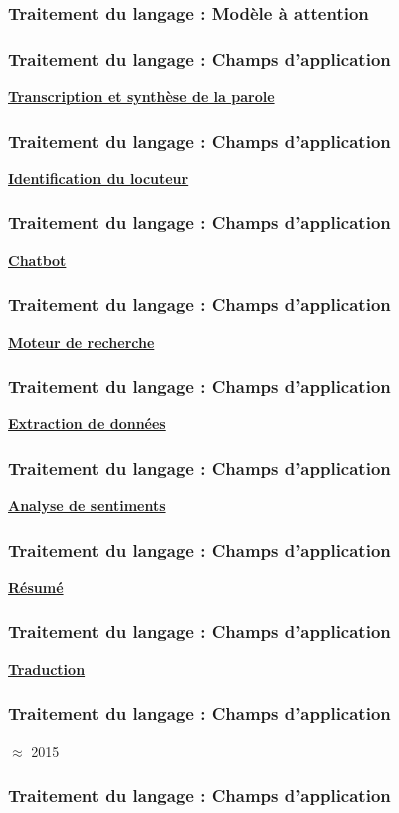 \documentclass{formation}
\begin{document}
\begin{frame}
  \frametitle{Traitement du langage : Modèle à attention} 
\end{frame}

\begin{frame}
  \frametitle{Traitement du langage : Champs d'application}
  \underline{\textbf{Transcription et synthèse de la parole}}
\end{frame}

\begin{frame}
  \frametitle{Traitement du langage : Champs d'application}
  \underline{\textbf{Identification du locuteur}}
\end{frame}

\begin{frame}
  \frametitle{Traitement du langage : Champs d'application}
  \underline{\textbf{Chatbot}}
\end{frame}

\begin{frame}
  \frametitle{Traitement du langage : Champs d'application}
  \underline{\textbf{Moteur de recherche}}
\end{frame}

\begin{frame}
  \frametitle{Traitement du langage : Champs d'application}
  \underline{\textbf{Extraction de données}}
\end{frame}

\begin{frame}
  \frametitle{Traitement du langage : Champs d'application}
  \underline{\textbf{Analyse de sentiments}}
\end{frame}

\begin{frame}
  \frametitle{Traitement du langage : Champs d'application}
  \underline{\textbf{Résumé}}
\end{frame}

\begin{frame}
  \frametitle{Traitement du langage : Champs d'application}
  \underline{\textbf{Traduction}}
  \begin{center}
  \end{center}
\end{frame}

\begin{frame}
  \frametitle{Traitement du langage : Champs d'application}
  \begin{center}
    $\approx$ 2015
  \end{center}
\end{frame}

\begin{frame}
  \frametitle{Traitement du langage : Champs d'application}
\end{frame}
\end{document}

